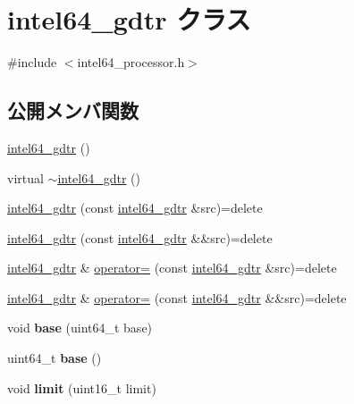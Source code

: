 \hypertarget{classintel64__gdtr}{}\section{intel64\+\_\+gdtr クラス}
\label{classintel64__gdtr}


{\ttfamily \#include $<$intel64\+\_\+processor.\+h$>$}

\subsection*{公開メンバ関数}
\begin{DoxyCompactItemize}
\item 
\hyperlink{classintel64__gdtr_a547a30192b7a6416e1c4e003d2003982}{intel64\+\_\+gdtr} ()
\item 
virtual \hyperlink{classintel64__gdtr_a154c307381e614180e819057843196a7}{$\sim$intel64\+\_\+gdtr} ()
\item 
\hyperlink{classintel64__gdtr_a92149e5369c4f35d2362c352e603633d}{intel64\+\_\+gdtr} (const \hyperlink{classintel64__gdtr}{intel64\+\_\+gdtr} \&src)=delete
\item 
\hyperlink{classintel64__gdtr_a48ba8bca138e66c87612a8fc463049c8}{intel64\+\_\+gdtr} (const \hyperlink{classintel64__gdtr}{intel64\+\_\+gdtr} \&\&src)=delete
\item 
\hyperlink{classintel64__gdtr}{intel64\+\_\+gdtr} \& \hyperlink{classintel64__gdtr_ab705898205d714e2106fb3d9644a4c93}{operator=} (const \hyperlink{classintel64__gdtr}{intel64\+\_\+gdtr} \&src)=delete
\item 
\hyperlink{classintel64__gdtr}{intel64\+\_\+gdtr} \& \hyperlink{classintel64__gdtr_a0d73a6320ba02bae68e79c4a2157366e}{operator=} (const \hyperlink{classintel64__gdtr}{intel64\+\_\+gdtr} \&\&src)=delete
\item 
\hypertarget{classintel64__gdtr_ad7655d8747d5497cbb7b41dded0583d9}{}\label{classintel64__gdtr_ad7655d8747d5497cbb7b41dded0583d9} 
void {\bfseries base} (uint64\+\_\+t base)
\item 
\hypertarget{classintel64__gdtr_ad6724b7696843466f0dd04548a7d8a10}{}\label{classintel64__gdtr_ad6724b7696843466f0dd04548a7d8a10} 
uint64\+\_\+t {\bfseries base} ()
\item 
\hypertarget{classintel64__gdtr_ad981f2ffb9bc4af7e2010b39c885ce78}{}\label{classintel64__gdtr_ad981f2ffb9bc4af7e2010b39c885ce78} 
void {\bfseries limit} (uint16\+\_\+t limit)
\item 
\hypertarget{classintel64__gdtr_a9f926b9329486ffaae0b971c4b094880}{}\label{classintel64__gdtr_a9f926b9329486ffaae0b971c4b094880} 

\end{DoxyCompactItemize}
